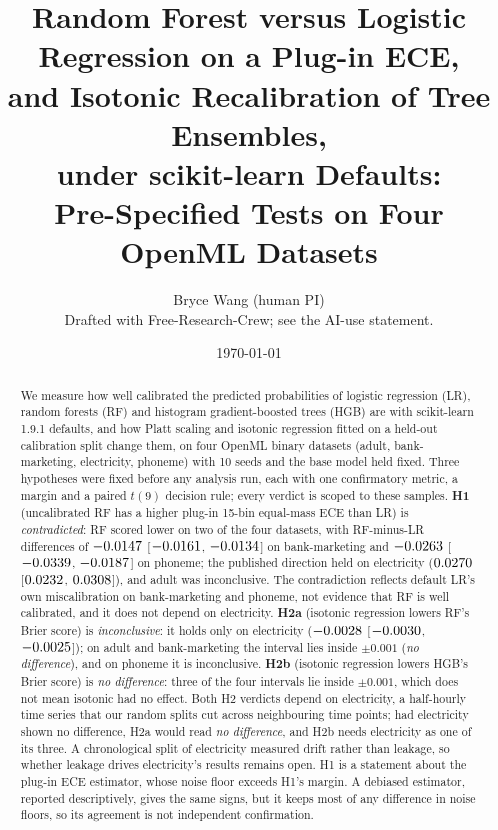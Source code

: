 \documentclass[11pt]{article}
\title{Random Forest versus Logistic Regression on a Plug-in ECE,\\
and Isotonic Recalibration of Tree Ensembles,\\
under scikit-learn Defaults:\\
Pre-Specified Tests on Four OpenML Datasets}
\author{Bryce Wang (human PI) \\ \small Drafted with Free-Research-Crew; see the AI-use statement.}
\date{\today}
\newcommand{\md}[3]{$#1$ [$#2$, $#3$]}
\newcommand{\ds}[1]{\textsf{#1}}
\newcommand{\ad}{\ds{adult}}
\newcommand{\bm}{\ds{bank-marketing}}
\newcommand{\el}{\ds{electricity}}
\newcommand{\ph}{\ds{phoneme}}
\newcommand{\cat}[1]{\emph{#1}}
\begin{document}
\maketitle

\begin{abstract}
We measure how well calibrated the predicted probabilities of logistic regression (LR),
random forests (RF) and histogram gradient-boosted trees (HGB) are with scikit-learn 1.9.1
defaults, and how Platt scaling and isotonic regression fitted on a held-out calibration
split change them, on four OpenML binary datasets (\ad, \bm, \el, \ph) with 10 seeds and the
base model held fixed. Three hypotheses were fixed before any analysis run, each with one
confirmatory metric, a margin and a paired $t(9)$ decision rule; every verdict is scoped to
these samples. \textbf{H1} (uncalibrated RF has a higher plug-in 15-bin equal-mass ECE than
LR) is \cat{contradicted}: RF scored lower on two of the four datasets, with RF-minus-LR
differences of \md{\HOneBankMean}{\HOneBankLo}{\HOneBankHi} on \bm{} and
\md{\HOnePhonemeMean}{\HOnePhonemeLo}{\HOnePhonemeHi} on \ph; the published direction held on
\el{} (\md{\HOneElecMean}{\HOneElecLo}{\HOneElecHi}), and \ad{} was inconclusive. The
contradiction reflects default LR's own miscalibration on \bm{} and \ph, not evidence that RF is well calibrated, and
it does not depend on \el. \textbf{H2a} (isotonic regression lowers RF's Brier score) is
\cat{inconclusive}: it holds only on \el{}
(\md{\HTwoAElecMean}{\HTwoAElecLo}{\HTwoAElecHi}); on \ad{} and \bm{} the interval lies inside
$\pm0.001$ (\cat{no difference}), and on \ph{} it is inconclusive. \textbf{H2b} (isotonic regression lowers HGB's
Brier score) is \cat{no difference}: three of the four intervals lie inside $\pm0.001$, which
does not mean isotonic had no effect. Both H2 verdicts depend on \el{}, a half-hourly time
series that our random splits cut across neighbouring time points; had \el{} shown no
difference, H2a would read \cat{no difference}, and H2b needs \el{} as one of its three. A
chronological split of \el{} measured drift rather than leakage, so whether leakage drives
\el's results remains open. H1 is a statement about the plug-in ECE estimator, whose noise
floor exceeds H1's margin. A debiased estimator, reported descriptively, gives the same signs,
but it keeps most of any difference in noise floors, so its agreement is not independent
confirmation.
\end{abstract}

\end{document}
